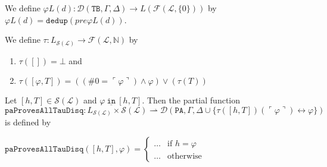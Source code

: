 \begin{definition}\label{def:Rel-Phis}
     We define $\varphi L(d) : \mathcal{D}(\texttt{TB},\Gamma,\Delta) \to L(\mathcal{F}(\mathcal{L},\{0\}))$ by $\varphi L(d) = \texttt{dedup}(pre\varphi L(d))$.
\end{definition}

\begin{definition}\label{def:Tau}
    \leanok
    We define $\tau : L_{\mathcal{S}(\mathcal{L})} \to \mathcal{F}(\mathcal{L},\mathbb{N})$ by
    \begin{enumerate}
    \item $\tau([]) = \bot$ and
    \item $\tau([\varphi,T]) = ((\#0 = \ulcorner \varphi \urcorner) \wedge \varphi) \vee (\tau(T))$	
    \end{enumerate}
\end{definition}

\begin{definition}\label{lem:PA-Proves-All-Tau-Disq}
    \leanok
    Let $[h,T] \in \mathcal{S}(\mathcal{L})$ and $\varphi ~\underline{\texttt{in}}~ [h,T]$. Then the partial function $\texttt{paProvesAllTauDisq}: L_{\mathcal{S}(\mathcal{L})} \times \mathcal{S}(\mathcal{L}) \rightharpoonup \mathcal{D}(\texttt{PA},\Gamma,\Delta \cup \{\tau([h,T])(\ulcorner \varphi \urcorner) \leftrightarrow \varphi \})$ is defined by
    
    $\texttt{paProvesAllTauDisq}([h,T],\varphi) = \begin{cases}
    \ldots & \text{if } h = \varphi \\
    \ldots & \text{otherwise }
    \end{cases}$
\end{definition}

